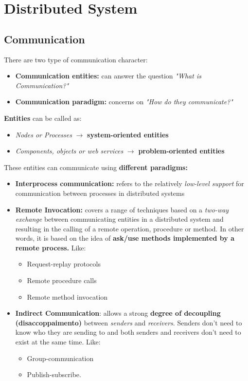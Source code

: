 \chapter{Distributed System}
\section{Communication}
There are two type of communication character:
\begin{itemize}
    \item \textbf{Communication entities:} can answer the question \textit{"What is Communication?"}
    \item \textbf{Communication paradigm:} concerns on \textit{"How do they communicate?"}
\end{itemize}
\textbf{Entities} can be called as:
\begin{itemize}
    \item \textit{Nodes or Processes} $\rightarrow$ \textbf{system-oriented entities}
    \item \textit{Components, objects or web services} $\rightarrow$ \textbf{problem-oriented entities}
\end{itemize}
These entities can communicate using \textbf{different paradigms:}
\begin{itemize}
    \item \textbf{Interprocess communication:} refers to the relatively \textit{low-level support} for communication between processes in distributed systems
    \item \textbf{Remote Invocation:} covers a range of techniques based on a \textit{two-way exchange} between communicating entities in a distributed system and resulting in the calling of a remote operation, procedure or method. In other words, it is based on the idea of \textbf{ask/use methods implemented by a remote process.} Like:
        \begin{itemize}
            \item Request-replay protocols
            \item Remote procedure calls
            \item Remote method invocation
        \end{itemize}
    \item \textbf{Indirect Communication}: allows a strong \textbf{degree of decoupling (disaccoppaimento)} between \textit{senders} and \textit{receivers}. Senders don’t need to know who they are sending to and both senders and receivers don’t need to exist at the same time. Like: 
        \begin{itemize}
            \item Group-communication
            \item Publish-subscribe.
        \end{itemize}
\end{itemize}

